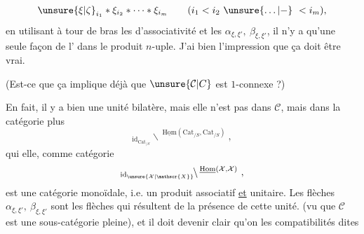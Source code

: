 
\[
\unsure{\xi|\zeta}_{i_1}*\xi_{i_2}*\cdots*\xi_{i_m}\qquad(i_1<i_2\ \unsure{\ldots|{-}}\ <i_m),
\]
en utilisant à tour de bras les  d'associativité et les $\alpha_{\xi,\xi'},\ \beta_{\xi,\xi'}$, il n'y a  qu'une seule façon de l' dans le produit $n$-uple. J'ai bien l'impression que ça doit être vrai.

(Est-ce que ça implique déjà que $\unsure{\mathcal{C}|C}$ est $1$-connexe ?)

En fait, il y a bien une unité bilatère, mais elle n'est pas dans $\mathcal{C}$, mais dans la catégorie plus  
\[
{}_{\mathrm{id}_{\mathrm{Cat}_{/S}}}\!\backslash\,{}^{\underline{\mathrm{Hom}}(\mathrm{Cat}_{/S},\mathrm{Cat}_{/S})}\ ,
\]
qui elle, comme  catégorie
\[
{}_{\mathrm{id}_{\unsure{\mathcal{X}|\mathscr{X}}}}\!\backslash\,{}^{\underline{\mathrm{Hom}}(\mathcal{X},\mathcal{X})}\ ,
\]
est une catégorie monoïdale, i.e. un produit associatif \uline{et} unitaire. Les  flèches $\alpha_{\xi,\xi'},\ \beta_{\xi,\xi'}$ sont les flèches qui résultent de la présence de cette unité. (vu que $\mathcal{C}$ est une sous-catégorie pleine), et  il doit devenir clair qu'on  les compatibilités dites
